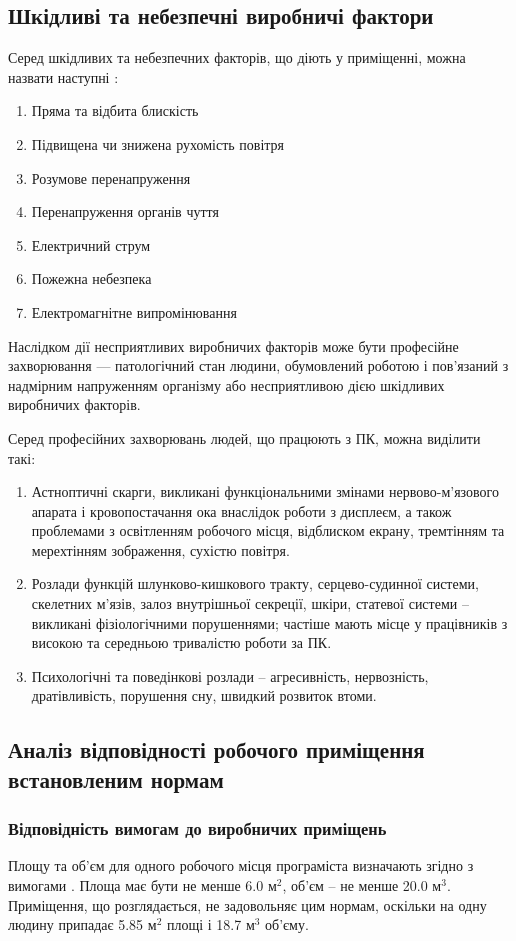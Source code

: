 \documentclass[a4paper,12pt]{article}
\begin{document}
\subsection{Шкідливі та небезпечні виробничі фактори}
Серед шкідливих та небезпечних факторів, що діють у приміщенні, можна назвати наступні \cite{gost12}:
\begin{enumerate}
\item Пряма та відбита блискість
\item Підвищена чи знижена рухомість повітря
\item Розумове перенапруження
\item Перенапруження органів чуття
\item Електричний струм
\item Пожежна небезпека
\item Електромагнітне випромінювання
\end{enumerate}

Наслідком дії несприятливих виробничих факторів може бути професійне захворювання — патологічний стан людини, обумовлений роботою і пов’язаний з надмірним напруженням організму або несприятливою дією шкідливих виробничих факторів.

Серед професійних захворювань людей, що працюють з ПК, можна виділити такі:
\begin{enumerate}
\item Астноптичні скарги, викликані функціональними змінами нервово-м’язового апарата і кровопостачання ока внаслідок роботи з дисплеєм, а також проблемами з освітленням робочого місця, відблиском екрану, тремтінням та мерехтінням зображення, сухістю повітря.
\item Розлади функцій шлунково-кишкового тракту, серцево-судинної системи, скелетних м’язів, залоз внутрішньої секреції, шкіри, статевої системи -- викликані фізіологічними порушеннями; частіше мають місце у працівників з високою та середньою тривалістю роботи за ПК.
\item Психологічні та поведінкові розлади -- агресивність, нервозність, дратівливість, порушення сну, швидкий розвиток втоми.
\end{enumerate}

\subsection{Аналіз відповідності робочого приміщення встановленим нормам}
\subsubsection{Відповідність вимогам до виробничих приміщень}
Площу  та  об'єм  для  одного  робочого місця програміста визначають згідно з вимогами \cite{sanpin798}. Площа має бути не менше 6.0 $\text{м}^2$, об'єм -- не менше 20.0 $\text{м}^3$. Приміщення, що розглядається, не задовольняє цим нормам, оскільки на одну людину припадає 5.85 $\text{м}^2$ площі і 18.7 $\text{м}^3$ об’єму.
\end{document}
